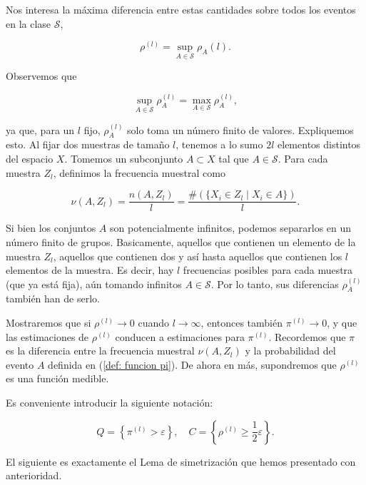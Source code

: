 \documentclass{report}
\begin{document}
Nos interesa la máxima diferencia entre estas cantidades sobre todos los eventos en la clase \( \mathcal{S} \),

\[
\rho^{(l)} = \sup_{A \in \mathcal{S}} \rho_A(l).
\]

Observemos que 

\[
\sup_{A \in \mathcal{S}} \rho_A^{(l)} = \max_{A \in \mathcal{S}} \rho_A^{(l)},
\]

ya que, para un \( l \) fijo, \( \rho_A^{(l)} \) solo toma un número finito de valores. Expliquemos esto.
Al fijar dos muestras de tamaño $l$, tenemos a lo sumo $2l$ elementos distintos del espacio $X$. Tomemos un
subconjunto $A\subset X$ tal que $A\in\mathcal{S}$. Para cada muestra $Z_l$, definimos la frecuencia muestral
como 

\[
\nu(A,Z_l) = \frac{n(A,Z_l)}{l} = \frac{\#(\{ X_i \in Z_l \mid X_i \in A \})}{l}.
\]

Si bien los conjuntos $A$ son potencialmente infinitos, podemos separarlos en un número finito de grupos. Basicamente,
aquellos que contienen un elemento de la muestra $Z_l$, aquellos que contienen dos y así hasta aquellos que contienen
los $l$ elementos de la muestra. Es decir, hay $l$ frecuencias posibles para cada muestra (que ya está fija), aún
tomando infinitos $A\in\mathcal{S}$. Por lo tanto, sus diferencias $\rho_A^{(l)}$ también han de serlo.\newline



Mostraremos que si \( \rho^{(l)} \to 0 \) cuando \( l \to \infty \), entonces también \( \pi^{(l)} \to 0 \), 
y que las estimaciones de \( \rho^{(l)}\) conducen a estimaciones para \( \pi^{(l)} \). Recordemos que $\pi$ es la diferencia
entre la frecuencia muestral $\nu(A,Z_l)$ y la probabilidad del evento $A$ definida en (\ref{def: funcion pi}).
De ahora en más, supondremos que \( \rho^{(l)} \) es una función medible.\newline

Es conveniente introducir la siguiente notación:

\[
Q = \left\{ \pi^{(l)} > \varepsilon \right\}, \quad C = \left\{ \rho^{(l)} \geq \frac{1}{2}\varepsilon \right\}.
\]

El siguiente es exactamente el Lema de simetrización que hemos presentado con anterioridad.\newline
\end{document}
